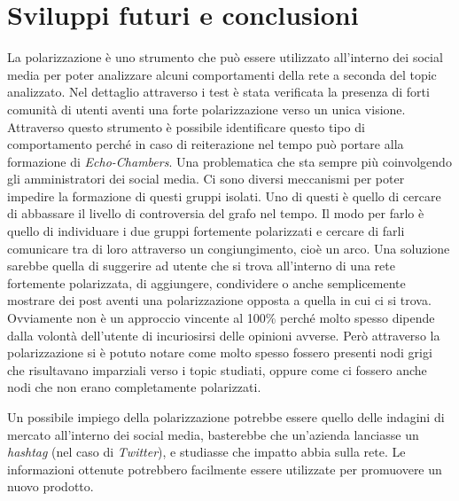 \chapter{Sviluppi futuri e conclusioni}
\label{capitolo7}
\thispagestyle{empty}


La polarizzazione è uno strumento che può essere utilizzato all'interno dei social media per poter analizzare alcuni comportamenti della rete a seconda del topic analizzato. Nel dettaglio attraverso i test è stata verificata la presenza di forti comunità di utenti aventi una forte polarizzazione verso un unica visione. Attraverso questo strumento è possibile identificare questo tipo di comportamento perché in caso di reiterazione nel tempo può portare alla formazione di \textit{Echo-Chambers}. Una problematica che sta sempre più coinvolgendo gli amministratori dei social media.
Ci sono diversi meccanismi per poter impedire la formazione di questi gruppi isolati. Uno di questi è quello di cercare di abbassare il livello di controversia del grafo nel tempo. Il modo per farlo è quello di individuare i due gruppi fortemente polarizzati e cercare di farli comunicare tra di loro attraverso un congiungimento, cioè un arco.
Una soluzione sarebbe quella di suggerire ad utente che si trova all'interno di una rete fortemente polarizzata, di aggiungere, condividere o anche semplicemente mostrare dei post aventi una polarizzazione opposta a quella in cui ci si trova. 
Ovviamente non è un approccio vincente al 100\% perché molto spesso dipende dalla volontà dell'utente di incuriosirsi delle opinioni avverse. Però attraverso la polarizzazione si è potuto notare come molto spesso fossero presenti nodi grigi che risultavano imparziali verso i topic studiati, oppure come ci fossero anche nodi che non erano completamente polarizzati.

Un possibile impiego della polarizzazione potrebbe essere quello delle indagini di mercato all'interno dei social media, basterebbe che un'azienda lanciasse un \textit{hashtag} (nel caso di \textit{Twitter}), e studiasse che impatto abbia sulla rete. Le informazioni ottenute potrebbero facilmente essere utilizzate per promuovere un nuovo prodotto. 

